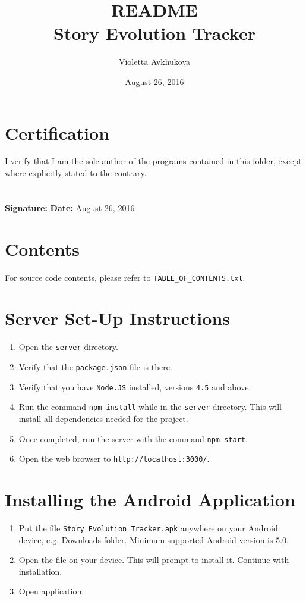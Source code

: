 \documentclass[11pt]{article}
\title{README \\ Story Evolution Tracker}
\author{Violetta Avkhukova}
\date{August 26, 2016}
\begin{document}
\maketitle

\section{Certification}
I verify that I am the sole author of the programs contained in this folder, except where explicitly stated to the contrary. \\ \\ \\
\textbf{Signature:} \hspace*{6cm} \textbf{Date:} August 26, 2016

\section{Contents}
For source code contents, please refer to \lstinline|TABLE_OF_CONTENTS.txt|.

\section{Server Set-Up Instructions}
\begin{enumerate}
	\item Open the \lstinline|server| directory.
	\item Verify that the \lstinline|package.json| file is there.
	\item Verify that you have \lstinline|Node.JS| installed, versions \lstinline|4.5| and above.
	\item Run the command \lstinline|npm install| while in the \lstinline|server| directory. This will install all dependencies needed for the project.
	\item Once completed, run the server with the command \lstinline|npm start|.
	\item Open the web browser to \lstinline|http://localhost:3000/|.
\end{enumerate}

\section{Installing the Android Application}
\begin{enumerate}
	\item Put the file \lstinline|Story Evolution Tracker.apk| anywhere on your Android device, e.g. Downloads folder. Minimum supported Android version is 5.0.
	\item Open the file on your device. This will prompt to install it. Continue with installation.
	\item Open application.
\end{enumerate}
\end{document}
